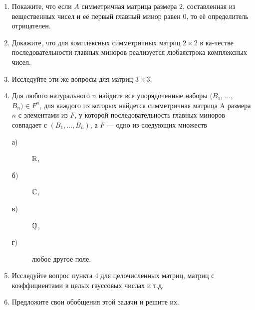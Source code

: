 \begin{enumerate}
\item Покажите, что если $A$ симметричная матрица размера $2$, составленная из вещественных чисел и её первый главный минор равен $0$, то её определитель отрицателен.
\item Докажите, что для комплексных симметричных матриц $2\times 2$ в ка-\linebreak честве последовательности главных миноров реализуется любая\linebreak строка комплексных чисел.
\item Исследуйте эти же вопросы для матриц $3\times 3$.
\item \label{targ} Для любого натурального $n$ найдите все упорядоченные наборы $(B_1$, $\ldots$, $B_n) \in F^n$, для каждого из которых найдется симметричная матрица A размера $n$ с элементами из $F$, у которой последовательность главных миноров совпадает с $(B_1, \dots , B_n )$, а $F$ — одно из следующих множеств
\begin{description}
\item[а) ] $\mathbb{R}$,
\item[б) ] $\mathbb{C}$,
\item[в) ] $\mathbb{Q}$,
\item[г) ] любое другое поле.
\end{description}
\item Исследуйте вопрос пункта 4 для целочисленных матриц, матриц с коэффициентами в целых гауссовых числах и т.д.
\item Предложите свои обобщения этой задачи и решите их.
\end{enumerate}





